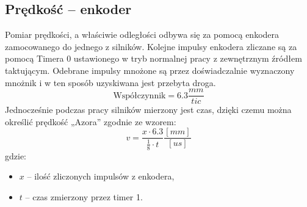     \subsection{Prędkość -- enkoder}\label{section:measure:enkoder}
        \tab Pomiar prędkości, a właściwie odległości odbywa się za pomocą enkodera zamocowanego do jednego z silników.
        Kolejne impulsy enkodera zliczane są za pomocą Timera 0 ustawionego w tryb normalnej pracy z zewnętrznym źródłem taktującym.  %
        Odebrane impulsy mnożone są przez doświadczalnie wyznaczony mnożnik i w ten sposób uzyskiwana jest przebyta droga.
        \begin{equation}
            \text{Współczynnik} = 6.3 \frac{mm}{tic}
        \end{equation}
        Jednocześnie podczas pracy silników mierzony jest czas, dzięki czemu można określić prędkość „Azora” zgodnie ze wzorem:
        \begin{equation}
            v = \frac{x\cdot 6.3}{\frac{1}{8}\cdot t}\frac{[mm]}{[us]}
        \end{equation}
        gdzie:
        \begin{itemize}
            \item $x$ -- ilość zliczonych impulsów z enkodera,
            \item $t$ -- czas zmierzony przez timer 1.
        \end{itemize}
        
